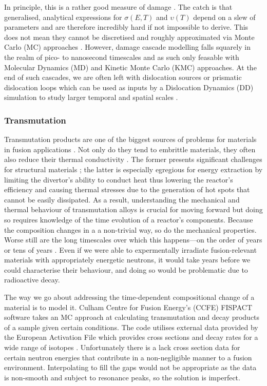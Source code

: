 In principle, this is a rather good measure of damage \cite{dpa}. The catch is that generalised, analytical expressions for $ \sigma(E,T) $ and $ \upsilon(T) $ depend on a slew of parameters and are therefore incredibly hard if not impossible to derive. This does not mean they cannot be discretised and roughly approximated via Monte Carlo (MC) approaches \cite{srim, srimisbad, dpa}. However, damage cascade modelling falls squarely in the realm of pico- to nanosecond timescales and as such only feasable with Molecular Dynamics (MD) and Kinetic Monte Carlo (KMC) \cite{dmg_cascade1, dmg_cascade2} approaches. At the end of such cascades, we are often left with dislocation sources or prismatic dislocation loops \cite{dmg_cascade_dln} which can be used as inputs by a Dislocation Dynamics (DD) simulation to study larger temporal and spatial scales \cite{fusmat1s}.

\subsubsection{Transmutation}
\label{sss:transmutation}
Transmutation products are one of the biggest sources of problems for materials in fusion applications \cite{fusmat1, mats_fusion1}. Not only do they tend to embrittle materials, they often also reduce their thermal conductivity \cite{transmute}. The former presents significant challenges for structural materials \cite{ods_rad_res}; the latter is especially egregious for energy extraction by limiting the divertor's ability to conduct heat thus lowering the reactor's efficiency and causing thermal stresses due to the generation of hot spots that cannot be easily dissipated. As a result, understanding the mechanical and thermal behaviour of transmutation alloys is crucial for moving forward \cite{nirrhard, colcas, hardening} but doing so requires knowledge of the time evolution of a reactor's components. Because the composition changes in a a non-trivial way, so do the mechanical properties. Worse still are the long timescales over which this happens---on the order of years or tens of years \cite{transmute2}. Even if we were able to expermentally irradiate fusion-relevant materials with appropriately energetic neutrons, it would take years before we could characterise their behaviour, and doing so would be problematic due to radioactive decay.

The way we go about addressing the time-dependent compositional change of a material is to model it. Culham Centre for Fusion Energy's (CCFE) FISPACT \cite{fispact} software takes an MC approach at calculating transmutation and decay products of a sample given certain conditions. The code utilises external data provided by the European Activation File which provides cross sections and decay rates for a wide range of isotopes \cite{fispact_library}. Unfortunately there is a lack cross section data for certain neutron energies that contribute in a non-negligible manner to a fusion environment. Interpolating to fill the gaps would not be appropriate as the data is non-smooth and subject to resonance peaks, so the solution is imperfect.

